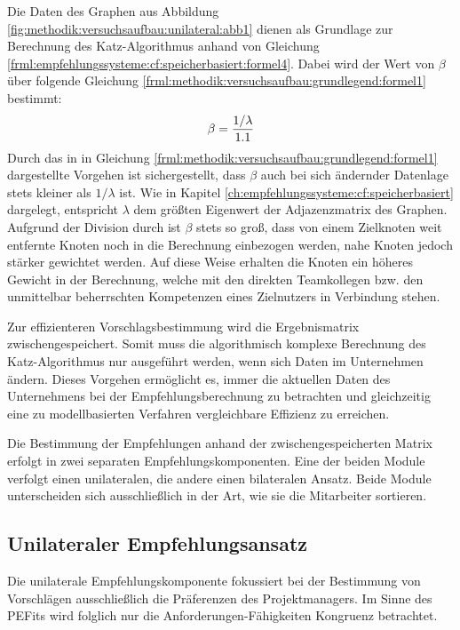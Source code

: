 Die Daten des Graphen aus Abbildung \ref{fig:methodik:versuchsaufbau:unilateral:abb1} dienen als Grundlage zur Berechnung des Katz-Algorithmus anhand von Gleichung \ref{frml:empfehlungssysteme:cf:speicherbasiert:formel4}. Dabei wird der Wert von $\beta$ über folgende Gleichung \ref{frml:methodik:versuchsaufbau:grundlegend:formel1} bestimmt: 
\begin{equation}
	\beta = \frac{1/\lambda}{1.1}
	\label{frml:methodik:versuchsaufbau:grundlegend:formel1}
\end{equation}
Durch das in in Gleichung \ref{frml:methodik:versuchsaufbau:grundlegend:formel1} dargestellte Vorgehen ist sichergestellt, dass $\beta$ auch bei sich ändernder Datenlage stets kleiner als $1/\lambda$ ist. Wie in Kapitel \ref{ch:empfehlungssysteme:cf:speicherbasiert} dargelegt, entspricht $\lambda$ dem größten Eigenwert der Adjazenzmatrix des Graphen. Aufgrund der Division durch \nenner ist $\beta$ stets so groß, dass von einem Zielknoten weit entfernte Knoten noch in die Berechnung einbezogen werden, nahe Knoten jedoch stärker gewichtet werden. Auf diese Weise erhalten die Knoten ein höheres Gewicht in der Berechnung, welche mit den direkten Teamkollegen bzw. den unmittelbar beherrschten Kompetenzen eines Zielnutzers in Verbindung stehen.

Zur effizienteren Vorschlagsbestimmung wird die Ergebnismatrix zwischengespeichert. Somit muss die algorithmisch komplexe Berechnung des Katz-Algorithmus nur ausgeführt werden, wenn sich Daten im Unternehmen ändern. Dieses Vorgehen ermöglicht es, immer die aktuellen Daten des Unternehmens bei der Empfehlungsberechnung zu betrachten und gleichzeitig eine zu modellbasierten Verfahren vergleichbare Effizienz zu erreichen.

Die Bestimmung der Empfehlungen anhand der zwischengespeicherten Matrix erfolgt in zwei separaten Empfehlungskomponenten. Eine der beiden Module verfolgt einen unilateralen, die andere einen bilateralen Ansatz. Beide Module unterscheiden sich ausschließlich in der Art, wie sie die Mitarbeiter sortieren.

\subsection{Unilateraler Empfehlungsansatz}
\label{ch:methodik:versuchsaufbau:unilateral}
Die unilaterale Empfehlungskomponente fokussiert bei der Bestimmung von Vorschlägen ausschließlich die Präferenzen des Projektmanagers. Im Sinne des \acp{PEFit} wird folglich nur die Anforderungen-Fähigkeiten Kongruenz betrachtet.


